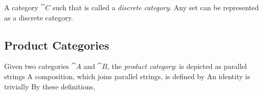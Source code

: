 A category $\cat{C}$ such that
is called a \emph{discrete category}.
Any set can be represented as a discrete category.


\subsection{Product Categories}

Given two categories $\cat{A}$ and $\cat{B}$, the \emph{product category}:
is depicted as parallel strings
A composition, which joins  parallel strings, is defined by
An identity is trivially
By these definitions,





